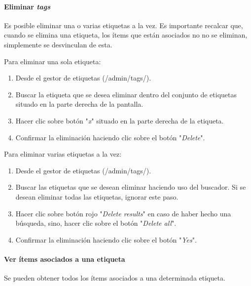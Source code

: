 \documentclass[
]{article}
\providecommand{\tightlist}{%
  \setlength{\itemsep}{0pt}\setlength{\parskip}{0pt}}
\begin{document}
\hypertarget{eliminar-tags}{%
\paragraph{\texorpdfstring{Eliminar
\emph{tags}}{Eliminar tags}}\label{eliminar-tags}}

Es posible eliminar una o varias etiquetas a la vez. Es importante
recalcar que, cuando se elimina una etiqueta, los ítems que están
asociados no no se eliminan, simplemente se desvinculan de esta.

Para eliminar una sola etiqueta:

\begin{enumerate}
\def\labelenumi{\arabic{enumi}.}
\tightlist
\item
  Desde el gestor de etiquetas ({/admin/tags/}).
\item
  Buscar la etiqueta que se desea eliminar dentro del conjunto de
  etiquetas situado en la parte derecha de la pantalla.
\item
  Hacer clic sobre botón "\emph{x}" situado en la parte derecha de la
  etiqueta.
\item
  Confirmar la eliminación haciendo clic sobre el botón "\emph{Delete}".
\end{enumerate}

Para eliminar varias etiquetas a la vez:

\begin{enumerate}
\def\labelenumi{\arabic{enumi}.}
\tightlist
\item
  Desde el gestor de etiquetas ({/admin/tags/}).
\item
  Buscar las etiquetas que se desean eliminar haciendo uso del buscador.
  Si se desean eliminar todas las etiquetas, ignorar este paso.
\item
  Hacer clic sobre botón rojo "\emph{Delete results}" en caso de haber
  hecho una búsqueda, sino, hacer clic sobre el botón "\emph{Delete
  all}".
\item
  Confirmar la eliminación haciendo clic sobre el botón "\emph{Yes}".
\end{enumerate}

\hypertarget{ver-uxedtems-asociados-a-una-etiqueta}{%
\paragraph{Ver ítems asociados a una
etiqueta}\label{ver-uxedtems-asociados-a-una-etiqueta}}

Se pueden obtener todos los ítems asociados a una determinada etiqueta.
\end{document}
